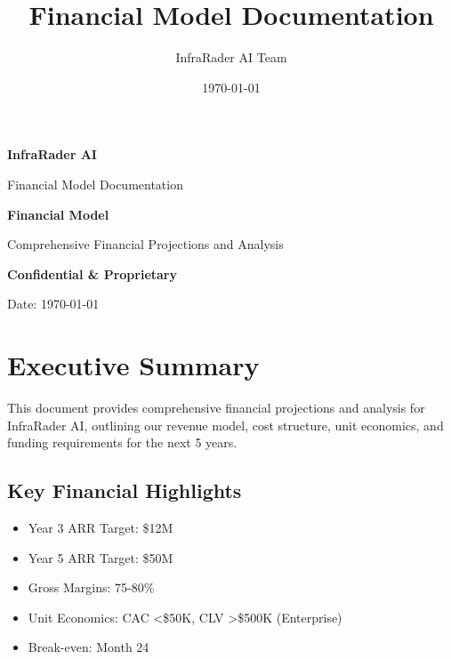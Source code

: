 \documentclass[business]{../templates/infraradar-main}
\title{Financial Model Documentation}
\author{InfraRader AI Team}
\date{\today}
\begin{document}
\begin{titlepage}
    \centering
    \vspace*{2cm}
    
    {\Huge\bfseries\color{infraradar@primary} InfraRader AI\par}
    \vspace{0.5cm}
    {\Large\color{infraradar@text} Financial Model Documentation\par}
    \vspace{2cm}
    
    {\huge\bfseries Financial Model\par}
    \vspace{1cm}
    
    {\large Comprehensive Financial Projections and Analysis\par}
    \vspace{2cm}
    
    {\large\bfseries\color{infraradar@primary} Confidential \& Proprietary\par}
    {\large Date: \today\par}
    
\end{titlepage}

\tableofcontents
\newpage

\section{Executive Summary}

This document provides comprehensive financial projections and analysis for InfraRader AI, outlining our revenue model, cost structure, unit economics, and funding requirements for the next 5 years.

\subsection{Key Financial Highlights}
\begin{itemize}
    \item Year 3 ARR Target: \$12M
    \item Year 5 ARR Target: \$50M
    \item Gross Margins: 75-80\%
    \item Unit Economics: CAC <\$50K, CLV >\$500K (Enterprise)
    \item Break-even: Month 24
\end{itemize}
\end{document}
